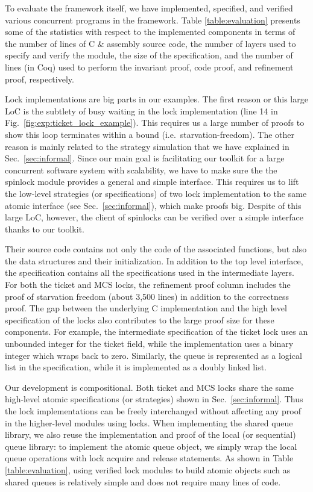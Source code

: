 
To evaluate the framework itself, we have implemented, specified, and verified various
concurrent programs in the framework. Table \ref{table:evaluation} presents some of the
statistics with respect to the implemented components in terms of the number of lines of C \& assembly
source code, the number of layers used to specify and verify the module, the size of the
specification, and the number of lines
(in Coq) used to perform the invariant proof, code proof, and refinement proof, respectively.

Lock implementations are  big parts in our examples. 
The first reason or this large LoC is the subtlety of busy waiting in the lock implementation 
(line 14 in Fig.~\ref{fig:exp:ticket_lock_example}). This requires us a large number of proofs to show 
 this loop
terminates within a bound (i.e.\, starvation-freedom). 
The other reason is mainly related to the strategy simulation 
that we have explained in Sec.~\ref{sec:informal}. 
Since our main goal is facilitating our toolkit for a large concurrent software system 
with scalability,  we have to make sure the the spinlock module provides
a general and simple interface.
This requires us to lift the low-level strategies (or specifications)
of two lock implementation to the same atomic interface (see Sec.~\ref{sec:informal}), which make proofs big.
Despite of this large LoC, however, the client of spinlocks can be verified over a simple interface
thanks to our toolkit.

Their source code contains not only
the code of the associated functions,
but also the data structures and their initialization.
In addition to the top level interface, the specification contains all the 
specifications used in the intermediate layers.
For both the ticket and MCS locks,
the refinement proof column
includes the proof of starvation freedom (about 3,500 lines) in addition to the correctness proof.
The gap between the underlying C implementation and the high level specification of the locks
also contributes to the large proof size for these components.
For example, the intermediate specification of the ticket lock uses an unbounded
integer for the ticket field,
while the implementation uses a binary integer
which wraps back to zero.
Similarly, the queue is represented as a logical list in the specification,
while it is implemented as a doubly linked list.


Our development is compositional. Both ticket  and MCS locks share the same
high-level atomic specifications (or strategies) shown in Sec.~\ref{sec:informal}.
Thus the lock implementations can be freely interchanged without affecting any proof
in the higher-level modules using locks. When implementing the shared queue library, we
also reuse the implementation and proof of the local (or sequential) queue library:
to implement the atomic queue object, we simply wrap the
local queue operations with lock acquire and release statements.
As shown in Table \ref{table:evaluation}, using verified lock modules to build
atomic objects such as shared queues is relatively simple and does not require
many lines of code.

